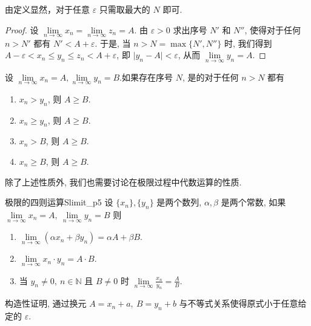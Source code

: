 \documentclass[cn,toc=twocol]{elegantbook}
\newcommand{\ITEMS}{\begin{enumerate}}
\newcommand{\ITEME}{\end{enumerate}}
\newcommand{\N}{\mathbb{N}}
\begin{document}
\begin{idea*}
由定义显然，对于任意 $\varepsilon$ 只需取最大的 $N$ 即可.
\end{idea*}

\begin{proof}
设 $\lim\limits_{n\to\infty} x_n = \lim\limits_{n\to\infty} z_n = A$. 由 $\varepsilon > 0$ 求出序号 $N'$ 和 $N''$, 使得对于任何 $n>N'$ 都有 $N'< A + \varepsilon$. 于是, 当 $n > N =\max\{N',N''\}$ 时, 我们得到 $A -\varepsilon < x_n \le y_n \le z_n < A + \varepsilon$, 即 $\lvert y_n - A\rvert < \varepsilon$, 从而 $\lim\limits_{n\to\infty} y_n = A$.
\end{proof}
\smallskip

\begin{corollary}
	设 $\lim\limits_{n\to\infty} x_n = A,  \lim\limits_{n\to\infty} y_n = B$.如果存在序号 $N$, 是的对于任何 $n > N$ 都有
	\ITEMS
		\item $x_n > y_n$, 则 $A\ge B$.
		\item $x_n \ge y_n$, 则 $A\ge B$.
		\item $x_n > B$, 则 $A\ge B$.
		\item $x_n \ge B$, 则 $A\ge B$.
	\ITEME
\end{corollary}

除了上述性质外, 我们也需要讨论在极限过程中代数运算的性质.  

\begin{theorem}{极限的四则运算}{Slimit_p5}
设 $\{x_n\}, \{y_n\}$ 是两个数列, $\alpha, \beta$ 是两个常数, 如果 $\lim\limits_{n\to\infty} x_n = A, \ \lim\limits_{n\to\infty} y_n = B$ 则
	\ITEMS
		\item $\lim\limits_{n\to\infty} (\alpha x_n + \beta y_n) = \alpha A + \beta B$.
		\item $\lim\limits_{n\to\infty} x_n \cdot y_n = A \cdot B$.
		\item 当 $y_n\neq 0, \ n\in\N$ 且 $B \neq 0$ 时 $\lim\limits_{n\to\infty} \frac{x_n}{y_n} = \frac AB$.
	\ITEME
\end{theorem}
 
\begin{idea*}
	构造性证明, 通过换元 $A = x_n + a,\ B = y_n + b$ 与不等式关系使得原式小于任意给定的 $\varepsilon$.
\end{idea*}
\end{document}
